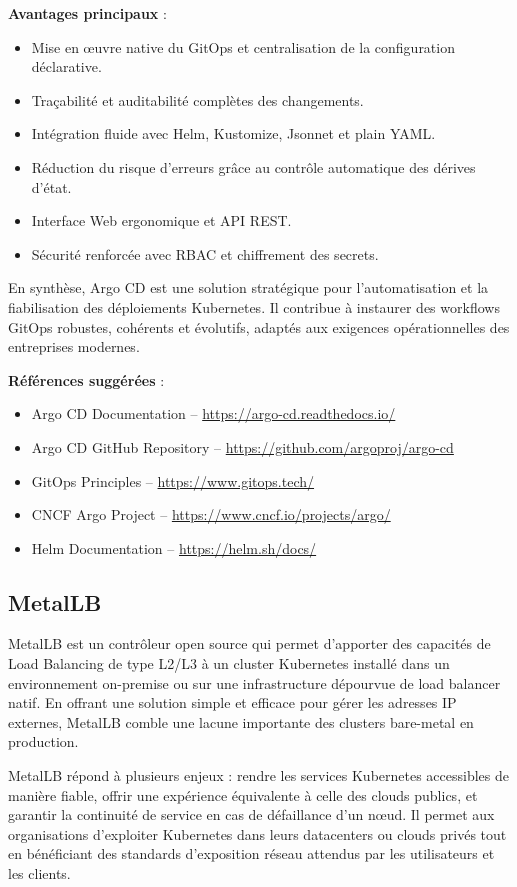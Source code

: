 \textbf{Avantages principaux} :
\begin{itemize}
	\item Mise en œuvre native du GitOps et centralisation de la configuration déclarative.
	\item Traçabilité et auditabilité complètes des changements.
	\item Intégration fluide avec Helm, Kustomize, Jsonnet et plain YAML.
	\item Réduction du risque d’erreurs grâce au contrôle automatique des dérives d’état.
	\item Interface Web ergonomique et API REST.
	\item Sécurité renforcée avec RBAC et chiffrement des secrets.
\end{itemize}

En synthèse, Argo CD est une solution stratégique pour l’automatisation et la fiabilisation des déploiements Kubernetes. Il contribue à instaurer des workflows GitOps robustes, cohérents et évolutifs, adaptés aux exigences opérationnelles des entreprises modernes.

\textbf{Références suggérées} :
\begin{itemize}
	\item Argo CD Documentation – \url{https://argo-cd.readthedocs.io/}
	\item Argo CD GitHub Repository – \url{https://github.com/argoproj/argo-cd}
	\item GitOps Principles – \url{https://www.gitops.tech/}
	\item CNCF Argo Project – \url{https://www.cncf.io/projects/argo/}
	\item Helm Documentation – \url{https://helm.sh/docs/}
\end{itemize}

\subsection{MetalLB}

MetalLB est un contrôleur open source qui permet d’apporter des capacités de Load Balancing de type L2/L3 à un cluster Kubernetes installé dans un environnement on-premise ou sur une infrastructure dépourvue de load balancer natif. En offrant une solution simple et efficace pour gérer les adresses IP externes, MetalLB comble une lacune importante des clusters bare-metal en production.

 MetalLB répond à plusieurs enjeux  : rendre les services Kubernetes accessibles de manière fiable, offrir une expérience équivalente à celle des clouds publics, et garantir la continuité de service en cas de défaillance d’un nœud. Il permet aux organisations d’exploiter Kubernetes dans leurs datacenters ou clouds privés tout en bénéficiant des standards d’exposition réseau attendus par les utilisateurs et les clients.

